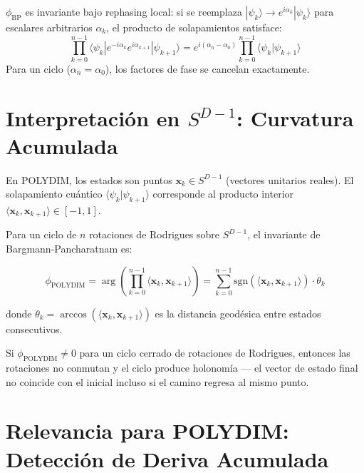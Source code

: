 \begin{theorem}
$\phi_{\text{BP}}$ es invariante bajo rephasing local: si se reemplaza
$|\psi_k\rangle \to e^{i\alpha_k}|\psi_k\rangle$ para escalares arbitrarios
$\alpha_k$, el producto de solapamientos satisface:
\begin{equation}
\prod_{k=0}^{n-1} \langle\psi_k| e^{-i\alpha_k} e^{i\alpha_{k+1}} |\psi_{k+1}\rangle = e^{i(\alpha_{n} - \alpha_0)} \prod_{k=0}^{n-1} \langle\psi_k|\psi_{k+1}\rangle
\end{equation}
Para un ciclo ($\alpha_n = \alpha_0$), los factores de fase se cancelan exactamente.
\end{theorem}

\section{Interpretación en $S^{D-1}$: Curvatura Acumulada}

En POLYDIM, los estados son puntos $\mathbf{x}_k \in S^{D-1}$ (vectores unitarios reales).
El solapamiento cuántico $\langle\psi_k|\psi_{k+1}\rangle$ corresponde al producto
interior $\langle \mathbf{x}_k, \mathbf{x}_{k+1} \rangle \in [-1, 1]$.

Para un ciclo de $n$ rotaciones de Rodrigues sobre $S^{D-1}$, el invariante de Bargmann-Pancharatnam es:

\begin{equation}
\phi_{\text{POLYDIM}} = \arg\left(\prod_{k=0}^{n-1} \langle \mathbf{x}_k, \mathbf{x}_{k+1} \rangle\right)
= \sum_{k=0}^{n-1} \text{sgn}(\langle \mathbf{x}_k, \mathbf{x}_{k+1}\rangle) \cdot \theta_k

\end{equation}

donde $\theta_k = \arccos(\langle \mathbf{x}_k, \mathbf{x}_{k+1}\rangle)$ es la distancia
geodésica entre estados consecutivos.

\begin{proposition}
Si $\phi_{\text{POLYDIM}} \ne 0$ para un ciclo cerrado de rotaciones de Rodrigues,
entonces las rotaciones no conmutan y el ciclo produce holonomía --- el vector
de estado final no coincide con el inicial incluso si el camino regresa al mismo punto.
\end{proposition}

\section{Relevancia para POLYDIM: Detección de Deriva Acumulada}

